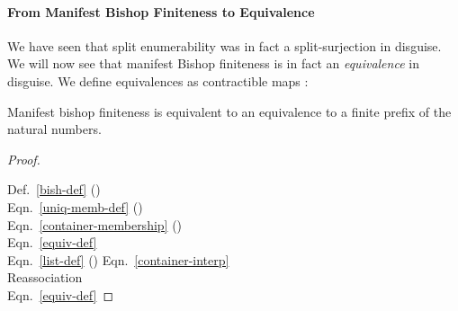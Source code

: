 \paragraph{From Manifest Bishop Finiteness to Equivalence}
We have seen that split enumerability was in fact a split-surjection in
disguise.
We will now see that manifest Bishop finiteness is in fact an \emph{equivalence}
in disguise.
We define equivalences as contractible maps \cite[definition 4.4.1]{hottbook}:
  \begin{agdalisting}\label{equiv-def}
    \begin{multicols}{2}
       \columnbreak
    \end{multicols}
  \end{agdalisting}
\begin{lemma}\label{bishop-equiv}
  Manifest bishop finiteness is equivalent to an equivalence to a finite prefix
  of the natural numbers.
  \begin{agdalisting*}
  \end{agdalisting*}
\end{lemma}
\begin{proof} \let\qed\relax \vspace{-1\baselineskip}\phantom{Proof.} \\
  \begin{minipage}[t]{.83\textwidth}\vspace{-1.25\baselineskip}
    \begin{agdalisting*}
    \end{agdalisting*}
  \end{minipage}
  \begin{minipage}[t]{.16\textwidth}

    Def.~\ref{bish-def} ()     \\
    Eqn.~\ref{uniq-memb-def} (\AgdaDatatype{\ensuremath{\in!}})       \\
    Eqn.~\ref{container-membership} (\AgdaDatatype{\ensuremath{\in}}) \\
    Eqn.~\ref{equiv-def} \\
    Eqn.~\ref{list-def} ({})
    Eqn.~\ref{container-interp}  \\
    Reassociation \\
    Eqn.~\ref{equiv-def}
  \end{minipage}
\end{proof}

